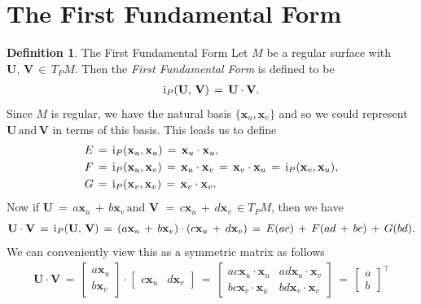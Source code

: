 \documentclass{UKZNcomp}
\newcommand{\vect}[1]{\mathbf{#1}} %
\newcommand{\RN}[1]{%
  \textup{\uppercase\expandafter{\romannumeral#1}}%
}
\theoremstyle{definition}
\newtheorem{definition}{Definition}[section]
\theoremstyle{remark}
\begin{document}
\section{The First Fundamental Form}
\begin{definition}{The First Fundamental Form}
Let $M$ be a regular surface with $\vect{U}, \, \vect{V} \, \in \, T_PM$. Then the \textit{First Fundamental Form} is defined to be
\begin{align*}
\RN{1}_P(\vect{U}, \, \vect{V}) \, = \,  \vect{U} \cdot \vect{V}.
\end{align*}
Since $M$ is regular, we have the natural basis $\{\vect x_u,\vect x_v\}$ and so we could represent $\vect{U} \, \text{and} \, \vect{V}$ in terms of this basis. This leads us to define
\begin{align*}
E \, &= \, \RN{1}_P(\vect x_u,\vect x_u) \, = \, \vect x_u \cdot \vect x_u,\\
F \, &= \, \RN{1}_P(\vect x_u,\vect x_v) \, = \, \vect x_u \cdot \vect x_v \, = \, \vect x_v \cdot \vect x_u \, = \, \RN{1}_P(\vect x_v,\vect x_u),\\
G \, &= \, \RN{1}_P(\vect x_v,\vect x_v) \, = \, \vect x_v \cdot \vect x_v.
\end{align*}
Now if $\vect{U} \ = \, a\vect x_u \, + \, b\vect x_v \, \text{and} \,\, \vect{V} \,\, = \, c\vect x_u \, + \, d\vect x_v \, \in T_PM$, then we have
\begin{align*}
\vect{U} \cdot \vect{V} \, = \, \RN{1}_P(\vect{U},\, \vect{V}) \, = \, (a\vect x_u \, + \, b\vect x_v)\cdot(c\vect x_u \, + \, d\vect x_v) \, = \, E(ac) \, + \, F(ad \, + \, bc) \, + \, G(bd).
\end{align*}
We can conveniently view this as a symmetric matrix as follows
\begin{align*}
\vect{U} \cdot \vect{V} \, = \,
\begin{bmatrix}
    a\vect x_u \\
    b\vect x_v
\end{bmatrix}
\cdot
\begin{bmatrix}
    c\vect x_u & d\vect x_v
\end{bmatrix}
\, = \,
\begin{bmatrix}
    ac\vect x_u\cdot\vect x_u & ad\vect x_u\cdot\vect x_v\\
    bc\vect x_v\cdot\vect x_u & bd\vect x_v\cdot\vect x_v
\end{bmatrix}
\, = \,
 \begin{bmatrix}
    a\\
    b
\end{bmatrix}^\intercal

\end{align*}
\end{definition}
\end{document}
